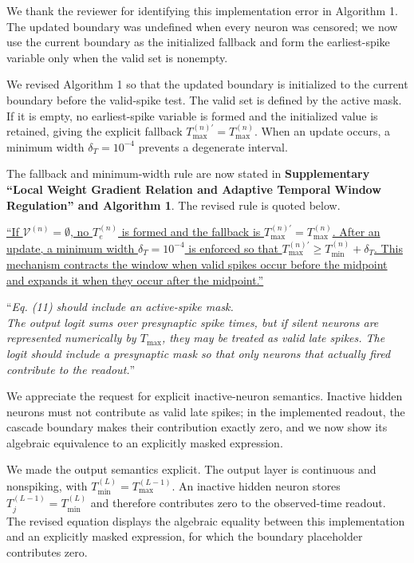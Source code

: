 \documentclass[12pt,technote,onecolumn]{IEEEtran}
\begin{document}
We thank the reviewer for identifying this implementation error in Algorithm 1. The updated boundary was undefined when every neuron was censored; we now use the current boundary as the initialized fallback and form the earliest-spike variable only when the valid set is nonempty.

We revised Algorithm 1 so that the updated boundary is initialized to
the current boundary before the valid-spike test. The valid set is
defined by the active mask. If it is empty, no earliest-spike variable
is formed and the initialized value is retained, giving the explicit
fallback \(T_{\max}^{(n)\prime}=T_{\max}^{(n)}\). When an update occurs,
a minimum width \(\delta_T=10^{-4}\) prevents a degenerate interval.



The fallback and minimum-width rule are now stated in \textbf{Supplementary ``Local Weight Gradient Relation and Adaptive Temporal Window Regulation'' and Algorithm 1}. The revised rule is quoted below.

\uline{``If $\mathcal{V}^{(n)}=\emptyset$, no $T_e^{(n)}$ is formed and the fallback is $T_{\max}^{(n)\prime}=T_{\max}^{(n)}$. After an update, a minimum width $\delta_T=10^{-4}$ is enforced so that $T_{\max}^{(n)\prime}\ge T_{\min}^{(n)}+\delta_T$. This mechanism contracts the window when valid spikes occur before the midpoint and expands it when they occur after the midpoint.''}

\vspace{4mm}

``{\it Eq. (11) should include an active-spike mask.\\
The output logit sums over presynaptic spike times, but if silent
neurons are represented numerically by \(T_{\max}\), they may be treated
as valid late spikes. The logit should include a presynaptic mask so
that only neurons that actually fired contribute to the readout.}''
\vspace{1mm}


We appreciate the request for explicit inactive-neuron semantics. Inactive hidden neurons must not contribute as valid late spikes; in the implemented readout, the cascade boundary makes their contribution exactly zero, and we now show its algebraic equivalence to an explicitly masked expression.

We made the output semantics explicit. The output layer is continuous
and nonspiking, with \(T_{\min}^{(L)}=T_{\max}^{(L-1)}\). An inactive
hidden neuron stores \(T_j^{(L-1)}=T_{\min}^{(L)}\) and therefore
contributes zero to the observed-time readout. The revised equation
displays the algebraic equality between this implementation and an
explicitly masked expression, for which the boundary placeholder
contributes zero.
\end{document}
